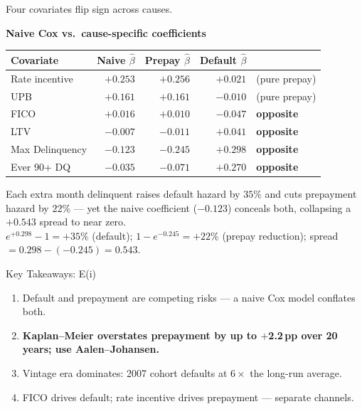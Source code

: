 \documentclass[10pt,aspectratio=169]{beamer}
\begin{document}
\begin{frame}{Four covariates flip sign across causes.}
    \vspace{0.2em}
    \begin{center}
    \small
    \textbf{Naive Cox vs.\ cause-specific coefficients}\\[4pt]
    \begin{tabular}{lrrrp{2.6cm}}
        \toprule
        \textbf{Covariate} & \textbf{Naive $\hat\beta$} & \textbf{Prepay $\hat\beta$} & \textbf{Default $\hat\beta$} & \\
        \midrule
        Rate incentive   & $+0.253$ & \textcolor{good}{$+0.256$} & $+0.021$                   & (pure prepay) \\
        UPB              & $+0.161$ & \textcolor{good}{$+0.161$} & $-0.010$                   & (pure prepay) \\
        \midrule
        FICO             & $+0.016$ & \textcolor{good}{$+0.010$} & \textcolor{bad}{$-0.047$}  & \textbf{opposite} \\
        LTV              & $-0.007$ & \textcolor{bad}{$-0.011$}  & \textcolor{good}{$+0.041$} & \textbf{opposite} \\
        Max Delinquency  & $-0.123$ & \textcolor{bad}{$-0.245$}  & \textcolor{good}{$+0.298$} & \textbf{opposite} \\
        Ever 90+ DQ      & $-0.035$ & \textcolor{bad}{$-0.071$}  & \textcolor{good}{$+0.270$} & \textbf{opposite} \\
        \bottomrule
    \end{tabular}
    \end{center}
    \vspace{0.3em}
    \begin{center}
        \small
        Each extra month delinquent raises default hazard by $35\%$ and cuts prepayment hazard by $22\%$
        --- yet the naive coefficient ($-0.123$) conceals both, collapsing a $+0.543$ spread to near zero.\\[4pt]
        \footnotesize
        $e^{+0.298}-1 = +35\%$ (default); \quad $1 - e^{-0.245} = +22\%$ (prepay reduction); \quad spread $= 0.298 - (-0.245) = 0.543$.
    \end{center}
\end{frame}

\begin{frame}{Key Takeaways: E(i)}
    \begin{enumerate}\itemsep14pt
        \item Default and prepayment are competing risks --- a naive Cox model conflates both.
        \item \textbf{Kaplan--Meier overstates prepayment by up to $+$2.2\,pp over 20 years; use Aalen--Johansen.}
        \item Vintage era dominates: 2007 cohort defaults at $6\times$ the long-run average.
        \item FICO drives default; rate incentive drives prepayment --- separate channels.
    \end{enumerate}
\end{frame}
\end{document}
